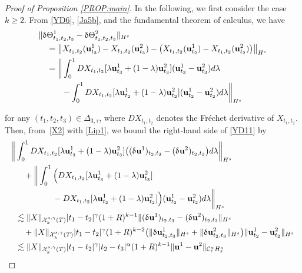 \documentclass[letterpaper, 11pt,  reqno]{amsart}
\newcommand{\1}{\hspace{0.5mm}\text{I}\hspace{0.5mm}}
\newcommand{\noi}{\noindent}
\newcommand{\CC}{\mathcal{C}}
\newcommand{\al}{\alpha}
\newcommand{\updl}{\updelta}
\newcommand{\Dl}{\Delta}
\newcommand{\g}{\gamma}
\newcommand{\ld}{\lambda}
\newcommand{\les}{\lesssim}
\newcommand{\cX}{\mathcal{X}}
\newcommand{\uu}{\mathbf{u}}
\newcommand{\Ta}{\Theta}
\numberwithin{equation}{section}
\numberwithin{theorem}{section}
\begin{document}
\begin{proof}[Proof of Proposition \ref{PROP:main}]
\noi
In the following, we first consider the case $k \ge 2$.
From \eqref{YD6}, 
\eqref{Ja5b}, 
and the fundamental theorem of calculus, 
we have 
\begin{align}
\label{YD11}
\begin{aligned}
 \|  \updl & \Theta^1_{t_1, t_2, t_3} - \updl \Ta^2_{t_1,t_2,t_3}\|_{H^s}\\
& = 
\big\|
X_{t_1,t_2}(\uu^1_{t_3}) - X_{t_1,t_2}(\uu^2 _{t_3})
-\big(X_{t_1,t_2}(\uu^1_{t_2}) - X_{t_1,t_2}(\uu^2_{t_2})\big)\big\|_{H^s}
\\
& =
\bigg\| 
\int^1_0 DX_{t_1,t_2}[\ld \uu^1_{t_3} + (1-\ld)\uu^2 _{t_3}]
(\uu^1_{t_3} - \uu^2_{t_3}) d \ld 
\\
& \hphantom{XX}
- \int^1_0 DX_{t_1,t_2}[\ld \uu^1_{t_2} + (1-\ld)\uu^2 _{t_2}]
 (\uu^1_{t_2} - \uu^2 _{t_2}) d \ld
\bigg\|_{H^s}
\end{aligned}
\end{align}


\noi
for any  $(t_1,t_2,t_3)\in \Dl_{3,\tau}$, where
$D X_{t_1, t_2}$ denotes the 
Fr\'echet derivative of $X_{t_1, t_2}$.
Then, from~\eqref{X2} with \eqref{Lip1}, 
we bound the right-hand side of \eqref{YD11}
by 
\begin{align}
\bigg\| & 
\int^1_0 DX_{t_1,t_2}[\ld \uu^1_{t_3} + (1-\ld)\uu^2 _{t_3}]
\big((\updl \uu^1)_{t_2,t_3} - (\updl \uu^2 )_{t_2,t_3}\big) d \ld \bigg\|_{H^s}
\notag \\
& \quad
+ \bigg\|\int^1_0 
\Big(DX_{t_1,t_2}[\ld \uu^1_{t_3} + (1-\ld)\uu^2 _{t_3}]\notag  \\
& \hphantom{XXXXX}
-  DX_{t_1,t_2}[\ld \uu^1_{t_2} + (1-\ld)\uu^2 _{t_2}]\Big)
 (\uu^1_{t_2} - \uu^2 _{t_2}) d \ld\bigg\|_{H^s}
\label{YD12} \\
& \les
\|X\|_{\cX^{s, \g}_k(T)} |t_1-t_2|^\g 
(1+R)^{k-1}
\|(\updl \uu^1)_{t_2,t_3} - (\updl \uu^2 )_{t_2,t_3}\|_{H^s}
\notag \\
& \quad +
\|X\|_{\cX^{s, \g}_k(T)} |t_1-t_2|^\g 
(1+R)^{k-2}
\big(\|\updl \uu^1_{t_2, t_3}\|_{H^s}+ \|\updl \uu^2_{t_2, t_3}\|_{H^s}\big)
\|\uu^1_{t_2} - \uu^2 _{t_2}\|_{H^s} \notag \\
& \les 
\|X\|_{\cX^{s, \g}_k(T)} |t_1-t_2|^\g 
|t_2 - t_3|^{\al} (1+R)^{k-1}\|\uu^1- \uu^2 \|_{\CC^\al _\tau H^s_x}
\notag 
\end{align}


\end{proof}
\end{document}
